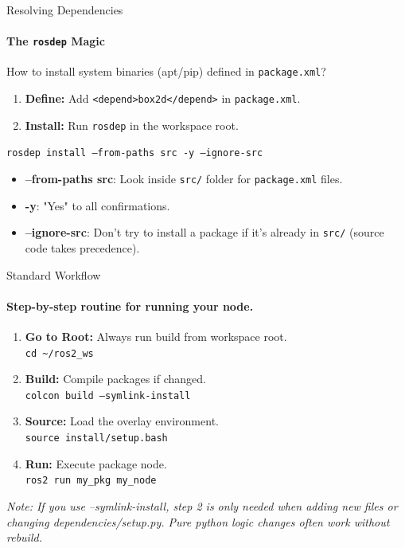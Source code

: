 \documentclass[aspectratio=169]{beamer}
\newcommand{\dbox}[1]{
\begin{mdframed}[roundcorner=3pt, backgroundcolor=yellow, linewidth=0]
\vspace{1mm}
{#1}
\vspace{1mm}
\end{mdframed}
}
\begin{document}
\begin{frame}{Resolving Dependencies}
    \framesubtitle{The \texttt{rosdep} Magic}
    \vspace*{-0.5cm}
    How to install system binaries (apt/pip) defined in \texttt{package.xml}?

    \begin{enumerate}
        \item \textbf{Define:} Add \texttt{<depend>box2d</depend>} in \texttt{package.xml}.
        \item \textbf{Install:} Run \texttt{rosdep} in the workspace root.
    \end{enumerate}
    
    \dbox{\texttt{rosdep install --from-paths src -y --ignore-src}}
    
    \begin{itemize}
        \item \textbf{--from-paths src}: Look inside \texttt{src/} folder for \texttt{package.xml} files.
        \item \textbf{-y}: "Yes" to all confirmations.
        \item \textbf{--ignore-src}: Don't try to install a package if it's already in \texttt{src/} (source code takes precedence).
    \end{itemize}
\end{frame}

\begin{frame}{Standard Workflow}
    \framesubtitle{Step-by-step routine for running your node.}
    \vspace*{-0.5cm}
    \begin{enumerate}
        \item \textbf{Go to Root:} Always run build from workspace root.
        \\ \texttt{cd \textasciitilde/ros2\_ws}
        
        \item \textbf{Build:} Compile packages if changed.
        \\ \texttt{colcon build --symlink-install}
        
        \item \textbf{Source:} Load the overlay environment.
        \\ \texttt{source install/setup.bash}
        
        \item \textbf{Run:} Execute package node.
        \\ \texttt{ros2 run my\_pkg my\_node}
    \end{enumerate}

    \begin{center}
    \scriptsize \textit{Note: If you use --symlink-install, step 2 is only needed when adding new files or changing dependencies/setup.py. Pure python logic changes often work without rebuild.}
    \end{center}
\end{frame}
\end{document}
